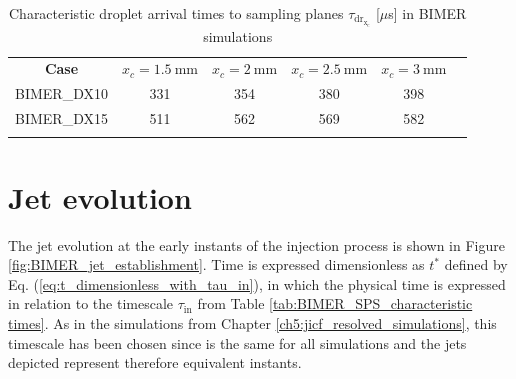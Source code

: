 \begin{table}[!h]
\centering
\caption{Characteristic droplet arrival times to sampling planes $\tau_\mathrm{dr_{x_c}}$ [$\mu$s] in BIMER simulations}
\begin{tabular}{cccccc}
\thickhline
\textbf{Case} &  $x_c = 1.5~\mathrm{mm}$ & $x_c = 2 ~ \mathrm{mm}$ & $x_c = 2.5 ~ \mathrm{mm}$ & $x_c = 3 ~ \mathrm{mm}$ \\
\thickhline 
BIMER\_DX10 & 331 & 354 & 380 & 398 \\
BIMER\_DX15 & 511 & 562 & 569 & 582 \\
\thickhline
\end{tabular}
\label{tab:BIMER_SPS_characteristic_droplet_sampling_times}
\end{table}


\section{Jet evolution}
\label{sec:ch8_BIMER_jet_evolution}

The jet evolution at the early instants of the injection process is shown in Figure \ref{fig:BIMER_jet_establishment}. Time is expressed dimensionless as $t^*$ defined by Eq. (\ref{eq:t_dimensionless_with_tau_in}), in which the physical time is expressed in relation to the timescale $\tau_\mathrm{in}$ from Table \ref{tab:BIMER_SPS_characteristic times}. As in the simulations from Chapter \ref{ch5:jicf_resolved_simulations}, this timescale has been chosen since is the same for all simulations and the jets depicted represent therefore equivalent instants.

